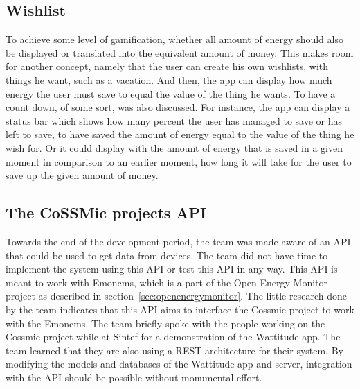 \subsection{Wishlist}
To achieve some level of gamification, whether all amount of energy should also be displayed or translated into the equivalent amount of money. This makes room for another concept, namely that the user can create his own wishlists, with things he want, such as a vacation. And then, the app can display how much energy the user must save to equal the value of the thing he wants. To have a count down, of some sort, was also discussed. For instance, the app can display a status bar which shows how many percent the user has managed to save or has left to save, to have saved the amount of energy equal to the value of the thing he wish for. Or it could display with the amount of energy that is saved in a given moment in comparison to an earlier moment, how long it will take for the user to save up the given amount of money.  

\subsection{The CoSSMic projects API}
\label{sec:cossmicapi}
Towards the end of the development period, the team was made aware of an API that could be used to get data from devices. The team did not have time to implement the system using this API or test this API in any way. This API is meant to work with Emoncms, which is a part of the Open Energy Monitor project as described in section~\ref{sec:openenergymonitor}. The little research done by the team indicates that this API aims to interface the Cossmic project to work with the Emoncms. The team briefly spoke with the people working on the Cossmic project while at Sintef for a demonstration of the Wattitude app. The team learned that they are also using a REST architecture for their system. By modifying the models and databases of the Wattitude app and server, integration with the API should be possible without monumental effort.